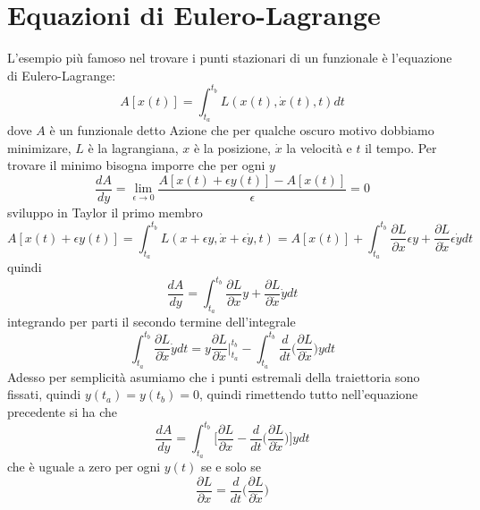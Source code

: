 \documentclass[11pt,a4paper]{article}
\theoremstyle{definition}
\theoremstyle{plain}
\theoremstyle{plain}
\begin{document}
	\section{Equazioni di Eulero-Lagrange}
		L'esempio più famoso nel trovare i punti stazionari di un funzionale è l'equazione di Eulero-Lagrange:
		\begin{equation}
			A[x(t)]=\int_{t_a}^{t_b}L(x(t),\dot{x}(t),t)dt
		\end{equation}
		dove $A$ è un funzionale detto Azione che per qualche oscuro motivo dobbiamo minimizare, $L$ è la lagrangiana, $x$ è la posizione, $\dot{x}$ la velocità e $t$ il tempo.
		Per trovare il minimo bisogna imporre che per ogni $y$
		\[
			\frac{dA}{dy}=\lim_{\epsilon \to 0}\frac{A[x(t)+\epsilon y(t)]-A[x(t)]}{\epsilon}=0
		\]
		sviluppo in Taylor il primo membro
		\[
			A[x(t)+\epsilon y(t)]=\int_{t_a}^{t_b}L(x+\epsilon y,\dot{x}+\epsilon \dot{y},t)=A[x(t)]+\int_{t_a}^{t_b}\frac{\partial{L}}{\partial{x}}\epsilon y+\frac{\partial{L}}{\partial{\dot{x}}}\epsilon \dot{y}dt
		\]
		quindi
		\[
			\frac{dA}{dy}=\int_{t_a}^{t_b}\frac{\partial{L}}{\partial{x}}y+\frac{\partial{L}}{\partial{\dot{x}}}\dot{y}dt
		\]
		integrando per parti il secondo termine dell'integrale
		\[
			\int_{t_a}^{t_b}\frac{\partial{L}}{\partial{\dot{x}}}\dot{y}dt=y\frac{\partial{L}}{\partial{\dot{x}}}\bigg\rvert_{t_a}^{t_b}-
			\int_{t_a}^{t_b}\frac{d}{dt}\bigg(\frac{\partial{L}}{\partial{\dot{x}}} \bigg)ydt
		\]
		Adesso per semplicità asumiamo che i punti estremali della traiettoria sono fissati, quindi $y(t_a)=y(t_b)=0$, quindi rimettendo tutto nell'equazione precedente si ha che
		\begin{equation}
			\frac{dA}{dy}=\int_{t_a}^{t_b}\bigg[\frac{\partial{L}}{\partial{x}}-\frac{d}{dt}\bigg(\frac{\partial{L}}{\partial{\dot{x}}} \bigg)\bigg]ydt
		\end{equation}
		che è uguale a zero per ogni $y(t)$ se e solo se 
		\begin{equation}
			\frac{\partial{L}}{\partial{x}}=\frac{d}{dt}\bigg(\frac{\partial{L}}{\partial{\dot{x}}} \bigg)
		\end{equation}
\end{document}
